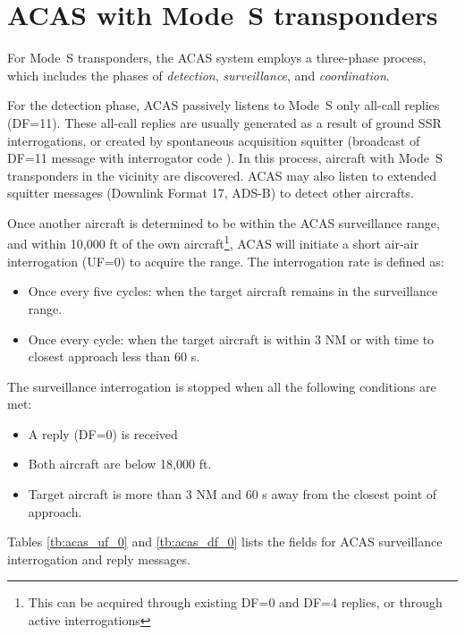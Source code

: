 \section{ACAS with Mode~S transponders}

For Mode~S transponders, the ACAS system employs a three-phase process, which includes the phases of \emph{detection}, \emph{surveillance}, and \emph{coordination}.

For the detection phase, ACAS passively listens to Mode~S only all-call replies (DF=11). These all-call replies are usually generated as a result of ground SSR interrogations, or created by spontaneous acquisition squitter (broadcast of DF=11 message with interrogator code \0). In this process, aircraft with Mode~S transponders in the vicinity are discovered. ACAS may also listen to extended squitter messages (Downlink Format 17, ADS-B) to detect other aircrafts.

Once another aircraft is determined to be within the ACAS surveillance range, and within 10,000 ft of the own aircraft\footnote{This can be acquired through existing DF=0 and DF=4 replies, or through active interrogations}, ACAS will initiate a short air-air interrogation (UF=0) to acquire the range. The interrogation rate is defined as:

\begin{itemize}
  \item Once every five cycles: when the target aircraft remains in the surveillance range.
  \item Once every cycle: when the target aircraft is within 3 NM or with time to closest approach less than 60 s.
\end{itemize}


The surveillance interrogation is stopped when all the following conditions are met:

\begin{itemize}
  \item A reply (DF=0) is received
  \item Both aircraft are below 18,000 ft.
  \item Target aircraft is more than 3 NM and 60 s away from the closest point of approach.
\end{itemize}


Tables \ref{tb:acas_uf_0} and \ref{tb:acas_df_0} lists the fields for ACAS surveillance interrogation and reply messages.

